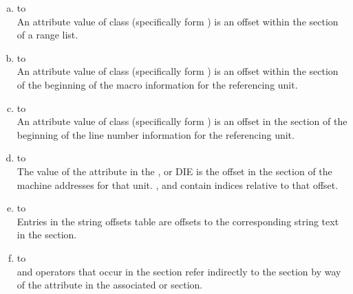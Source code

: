 \begin{enumerate}[(a)]
\item \dotdebuginfo{} to \dotdebugranges \\
An attribute value of class  
(specifically form
\DWFORMsecoffset) 
is an offset within the \dotdebugranges{} section of
a range list.

\item \dotdebuginfo{} to \dotdebugmacinfo \\
An attribute value of class 
 (specifically form
\DWFORMsecoffset) is an 
offset within the 
\dotdebugmacinfo{} section
of the beginning of the macro information for the referencing unit.

\item \dotdebuginfo{} to \dotdebugline \\
An attribute value of class 
 (specifically form
\DWFORMsecoffset) 
is an offset in the 
\dotdebugline{} section of the
beginning of the line number information for the referencing unit.

\item \dotdebuginfo{} to \dotdebugaddr \\
The value of the \DWATaddrbase{} attribute in the
\DWTAGcompileunit{}, \DWTAGtypeunit{} or \DWTAGpartialunit{} DIE is the
offset in the \dotdebugaddr{} section of the machine
addresses for that unit.
\DWFORMaddrx, \DWOPaddrx{} and \DWOPconstx{} contain
indices relative to that offset.

\item \dotdebugstroffsets{} to \dotdebugstr \\
Entries in the string offsets table
are offsets to the corresponding string text in the 
\dotdebugstr{} section.

\item \dotdebugloc{} to \dotdebugaddr \\
\DWOPaddrx{} and \DWOPconstx{} operators that occur in the 
\dotdebugloc{} section refer indirectly to the 
\dotdebugaddr{} section by way of the 
\DWATaddrbase{} attribute in the associated \dotdebuginfo{} or 
\dotdebugtypes{} section. 
\end{enumerate}
